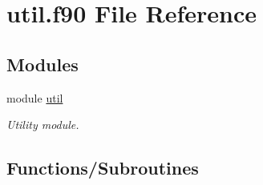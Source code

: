 \hypertarget{util_8f90}{}\section{util.\+f90 File Reference}
\label{util_8f90}
\subsection*{Modules}
\begin{DoxyCompactItemize}
\item 
module \hyperlink{namespaceutil}{util}
\begin{DoxyCompactList}\small\item\em Utility module. \end{DoxyCompactList}\end{DoxyCompactItemize}
\subsection*{Functions/\+Subroutines}
